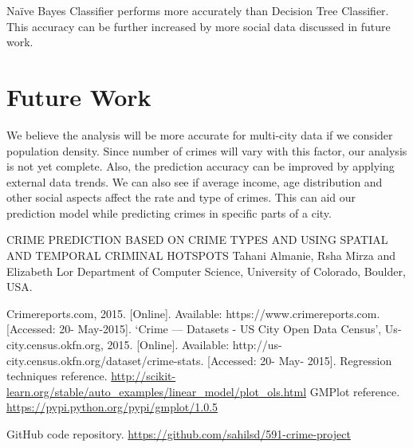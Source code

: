 \documentclass[journal, a4paper]{IEEEtran}
\begin{document}
Na{\"i}ve Bayes Classifier performs more accurately than Decision Tree Classifier. This accuracy can be further increased by more social data discussed in future work.

\section{Future Work}
We believe the analysis will be more accurate for multi-city data if we consider population density. Since number of crimes will vary with this factor, our analysis is not yet complete. Also, the prediction accuracy can be improved by applying external data trends. We can also see if average income, age distribution and other social aspects affect the rate and type of crimes. This can aid our prediction model while predicting crimes in specific parts of a city.
\begin{thebibliography}{5}

    CRIME PREDICTION BASED ON CRIME TYPES AND USING SPATIAL AND  TEMPORAL CRIMINAL HOTSPOTS Tahani Almanie, Rsha Mirza and Elizabeth Lor Department of Computer Science, University of Colorado, Boulder, USA.

    Crimereports.com, 2015. [Online]. Available: https://www.crimereports.com. [Accessed: 20- May-2015].
    `Crime — Datasets - US City Open Data Census', Us-city.census.okfn.org, 2015. [Online]. Available: http://us-city.census.okfn.org/dataset/crime-stats. [Accessed: 20- May- 2015].
    Regression techniques reference. 
    \url{http://scikit-learn.org/stable/auto_examples/linear_model/plot_ols.html}
    GMPlot reference.
    \url{https://pypi.python.org/pypi/gmplot/1.0.5}
    
    GitHub code repository.
    \url{https://github.com/sahilsd/591-crime-project}

\end{thebibliography}

\end{document}

